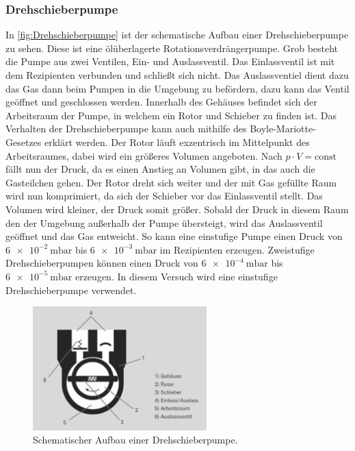         \subsubsection{Drehschieberpumpe}
            In \autoref{fig:Drehschieberpumpe} ist der schematische Aufbau einer Drehschieberpumpe zu sehen.
            Diese ist eine ölüberlagerte Rotationsverdrängerpumpe.
            Grob besteht die Pumpe aus zwei Ventilen, Ein- und Auslassventil.
            Das Einlassventil ist mit dem Rezipienten verbunden und schließt sich nicht.
            Das Auslassventiel dient dazu das Gas dann beim Pumpen in die Umgebung zu befördern, dazu kann das Ventil geöffnet und geschlossen werden.
            Innerhalb des Gehäuses befindet sich der Arbeitsraum der Pumpe, in welchem ein Rotor und Schieber zu finden ist.
            Das Verhalten der Drehschieberpumpe kann auch mithilfe des Boyle-Mariotte-Gesetzes erklärt werden.
            Der Rotor läuft exzentrisch im Mittelpunkt des Arbeitsraumes, dabei wird ein größeres Volumen angeboten.
            Nach $p \cdot V = \text{const}$ fällt nun der Druck, da es einen Anstieg an Volumen gibt, in das auch die Gasteilchen gehen.
            Der Rotor dreht sich weiter und der mit Gas gefüllte Raum wird nun komprimiert, da sich der Schieber vor das Einlassventil stellt.
            Das Volumen wird kleiner, der Druck somit größer.
            Sobald der Druck in diesem Raum den der Umgebung außerhalb der Pumpe übersteigt, wird das Auslassventil geöffnet und das Gas entweicht.
            So kann eine einstufige Pumpe einen Druck von $\SI{6e-2}{\milli\bar}$ bis $\SI{6e-3}{\milli\bar}$ im Rezipienten erzeugen.\cite{VakuumBuch}
            Zweistufige Drehschieberpumpen können einen Druck von $\SI{6e-4}{\milli\bar}$ bis $\SI{6e-5}{\milli\bar}$ erzeugen.\cite{VakuumBuch}
            In diesem Versuch wird eine einstufige Drehschieberpumpe verwendet.
      
        \begin{figure}[H]
            \centering
            \includegraphics[width=0.6\textwidth]{bilder/Drehschieberpumpe.png}
            \caption{Schematischer Aufbau einer Drehschieberpumpe.\cite{Pfeiffer}}
            \label{fig:Drehschieberpumpe}
        \end{figure}

